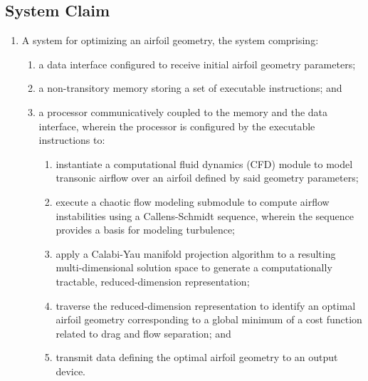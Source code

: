 \documentclass{article}
\begin{document}
\subsection{System Claim}
\begin{enumerate}
    \item[1.] A system for optimizing an airfoil geometry, the system comprising:
    \begin{enumerate}
        \item[(a)] a data interface configured to receive initial airfoil geometry parameters;
        \item[(b)] a non-transitory memory storing a set of executable instructions; and
        \item[(c)] a processor communicatively coupled to the memory and the data interface, wherein the processor is configured by the executable instructions to:
        \begin{enumerate}
            \item[(i)] instantiate a computational fluid dynamics (CFD) module to model transonic airflow over an airfoil defined by said geometry parameters;
            \item[(ii)] execute a chaotic flow modeling submodule to compute airflow instabilities using a Callens-Schmidt sequence, wherein the sequence provides a basis for modeling turbulence;
            \item[(iii)] apply a Calabi-Yau manifold projection algorithm to a resulting multi-dimensional solution space to generate a computationally tractable, reduced-dimension representation;
            \item[(iv)] traverse the reduced-dimension representation to identify an optimal airfoil geometry corresponding to a global minimum of a cost function related to drag and flow separation; and
            \item[(v)] transmit data defining the optimal airfoil geometry to an output device.
        \end{enumerate}
    \end{enumerate}
\end{enumerate}
\end{document}
